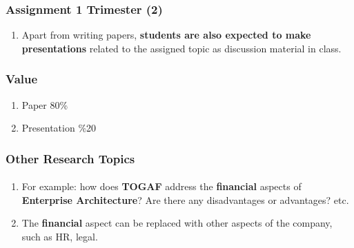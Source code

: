 \documentclass[aspectratio=169, table]{beamer}
\begin{document}
    \begin{frame}
        \frametitle{Assignment 1 Trimester (2)}
        \begin{enumerate}
            \item Apart from writing papers, \textbf{students are also expected to make presentations} related to the assigned topic as discussion material in class.
        \end{enumerate}
    \end{frame}

    \begin{frame}
        \frametitle{Value}
        \begin{enumerate}
            \item Paper 80\%
            \item Presentation \%20
        \end{enumerate}
    \end{frame}

    \begin{frame}
        \frametitle{Other Research Topics}
        \framesubtitle{\hspace{1cm}}
        \begin{enumerate}
            \item For example: how does \textbf{TOGAF} address the \textbf{financial} aspects of \textbf{Enterprise Architecture}? Are there any disadvantages or advantages? etc.
            \item The \textbf{financial} aspect can be replaced with other aspects of the company, such as HR, legal.
        \end{enumerate}
    \end{frame}
\end{document}
